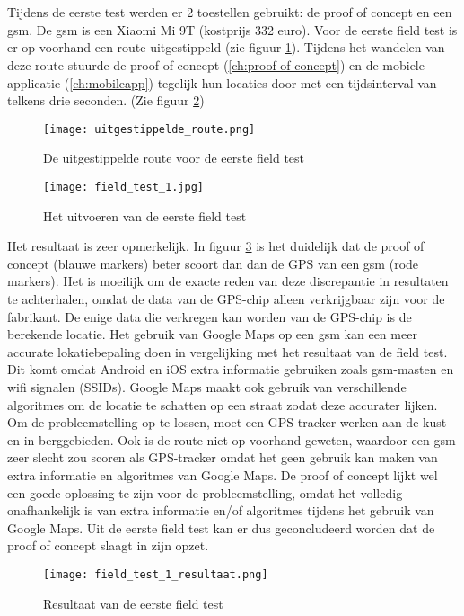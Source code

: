 \section{}
Tijdens de eerste test werden er 2 toestellen gebruikt: de proof of concept en een gsm. De gsm is een Xiaomi Mi 9T (kostprijs 332 euro).
Voor de eerste field test is er op voorhand een route uitgestippeld (zie figuur \ref{fig:uitgestippelde_route}). Tijdens het wandelen van deze route stuurde de proof of concept (\ref{ch:proof-of-concept}) en de mobiele applicatie (\ref{ch:mobileapp}) tegelijk hun locaties door met een tijdsinterval van telkens drie seconden. (Zie figuur \ref{fig:field_test_1})
\begin{figure}
	\texttt{[image: uitgestippelde\_route.png]}
	\caption{De uitgestippelde route voor de eerste field test}
	\label{fig:uitgestippelde_route}
\end{figure}
\begin{figure}
	\texttt{[image: field\_test\_1.jpg]}
	\caption{Het uitvoeren van de eerste field test}
	\label{fig:field_test_1}
\end{figure}
\newline
\newline
Het resultaat is zeer opmerkelijk. In figuur \ref{fig:field_test_1_resultaat} is het duidelijk dat de proof of concept (blauwe markers) beter scoort dan dan de GPS van een gsm (rode markers). Het is moeilijk om de exacte reden van deze discrepantie in resultaten te achterhalen, omdat de data van de GPS-chip alleen verkrijgbaar zijn voor de fabrikant. De enige data die verkregen kan worden van de GPS-chip is de berekende locatie. 
\newline
Het gebruik van Google Maps op een gsm kan een meer accurate lokatiebepaling doen in vergelijking met het resultaat van de field test. Dit komt omdat Android en iOS extra informatie gebruiken zoals gsm-masten en wifi signalen (SSIDs). Google Maps maakt ook gebruik van verschillende algoritmes om de locatie te schatten op een straat zodat deze accurater lijken.
\newline
Om de probleemstelling op te lossen, moet een GPS-tracker werken aan de kust en in berggebieden. Ook is de route niet op voorhand geweten, waardoor een gsm zeer slecht zou scoren als GPS-tracker omdat het geen gebruik kan maken van extra informatie en algoritmes van Google Maps. De proof of concept lijkt wel een goede oplossing te zijn voor de probleemstelling, omdat het volledig onafhankelijk is van extra informatie en/of algoritmes tijdens het gebruik van Google Maps. 
\newline
Uit de eerste field test kan er dus geconcludeerd worden dat de proof of concept slaagt in zijn opzet.
\begin{figure}
	\texttt{[image: field\_test\_1\_resultaat.png]}
	\caption{Resultaat van de eerste field test}
	\label{fig:field_test_1_resultaat}
\end{figure}
\section{}